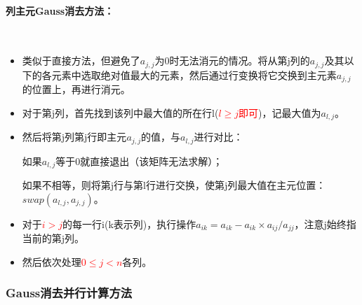 \documentclass[UTF8]{article}%
\begin{document}
\paragraph{列主元Gauss消去方法：}~{}

\begin{itemize}
    \item 类似于直接方法，但避免了$a_{j,j}$为0时无法消元的情况。将从第j列的$a_{j,j}$及其以下的各元素中选取绝对值最大的元素，然后通过行变换将它交换到主元素$a_{j,j}$的位置上，再进行消元。
    \item 对于第j列，首先找到该列中最大值的所在行l(\textcolor{red}{$l\geq j$即可})，记最大值为$a_{l,j}$。
    \item 然后将第j列第j行即主元$a_{j,j}$的值，与$a_{l,j}$进行对比：
    
    如果$a_{l,j}$等于0就直接退出（该矩阵无法求解）；
    
    如果不相等，则将第j行与第l行进行交换，使第j列最大值在主元位置： $swap(a_{l,j},a_{j,j})$。

    \item 对于\textcolor{red}{$i>j$}的每一行i(k表示列)，执行操作$a_{ik}=a_{ik}-a_{ik}\times a_{ij}/a_{jj}$，注意j始终指当前的第j列。
    \item 然后依次处理\textcolor{red}{$0\leq j < n$}各列。
\end{itemize}

\subsubsection{Gauss消去并行计算方法}
\end{document}
